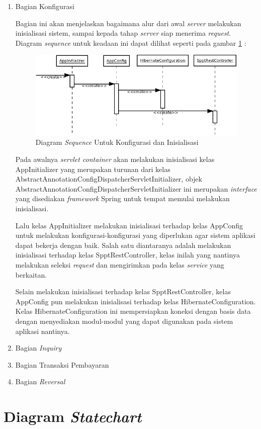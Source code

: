 \begin{enumerate}
  \item Bagian Konfigurasi
  
  Bagian ini akan menjelaskan bagaimana alur dari awal \textit{server} melakukan inisialisasi sistem, sampai kepada tahap \textit{server} siap menerima \textit{request}. Diagram \textit{sequence} untuk keadaan ini dapat dilihat seperti pada gambar \ref{fig:uml-seq-konf} :
  
  \begin{figure}[H]
    \centering
    \includegraphics[width=1\textwidth]{./resources/uml/uml-seq-konf}
    \caption{Diagram \textit{Sequence} Untuk Konfigurasi dan Inisialisasi}
    \label{fig:uml-seq-konf}
  \end{figure}
  
  Pada awalnya \textit{servlet container} akan melakukan inisialisasi kelas AppInitializer yang merupakan turunan dari kelas AbstractAnnotationConfigDispatcherServletInitializer, objek AbstractAnnotationConfigDispatcherServletInitializer ini merupakan \textit{interface} yang disediakan \textit{framework} Spring untuk tempat memulai melakukan inisialisasi.
  
  Lalu kelas AppInitializer melakukan inisialisasi terhadap kelas AppConfig untuk melakukan konfigurasi-konfigurasi yang diperlukan agar sistem aplikasi dapat bekerja dengan baik. Salah satu diantaranya adalah melakukan inisialisasi terhadap kelas SpptRestController, kelas inilah yang nantinya melakukan seleksi \textit{request} dan mengirimkan pada kelas \textit{service} yang berkaitan.
  
  Selain melakukan inisialisasi terhadap kelas SpptRestController, kelas AppConfig pun melakukan inisialisasi terhadap kelas HibernateConfiguration. Kelas HibernateConfiguration ini mempersiapkan koneksi dengan basis data dengan menyediakan modul-modul yang dapat digunakan pada sistem aplikasi nantinya.
  
  \item Bagian \textit{Inquiry}
  \item Bagian Transaksi Pembayaran
  \item Bagian \textit{Reversal}
\end{enumerate}

\section{Diagram \textit{Statechart}}

